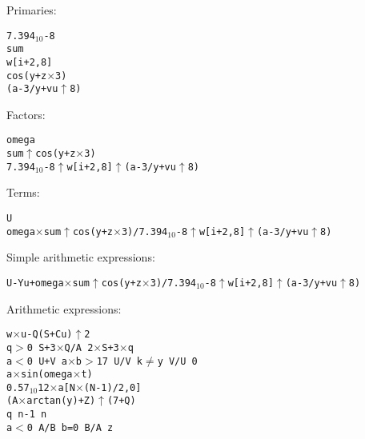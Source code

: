 \documentclass[a4paper,11pt]{article}
\begin{document}
Primaries:

\begin{flushleft}
\texttt{7.394$_{10}$-8\\
sum\\
w[i+2,8]\\
cos(y+z$\times$3)\\
(a-3/y+vu$\uparrow$8)\\
}\end{flushleft}

Factors:

\begin{flushleft}
\texttt{omega\\
sum$\uparrow$cos(y+z$\times$3)\\
7.394$_{10}$-8$\uparrow$w[i+2,8]$\uparrow$(a-3/y+vu$\uparrow$8)
}\end{flushleft}

Terms:

\begin{flushleft}
\texttt{U\\
omega$\times$sum$\uparrow$cos(y+z$\times${}3)/7.394$_{10}$-8$\uparrow$w[i+2,8]$\uparrow$(a-3/y+vu$\uparrow$8)\\
}\end{flushleft}

Simple arithmetic expressions:

\begin{flushleft}
\texttt{U-Yu+omega$\times$sum$\uparrow$cos(y+z$\times$3)/7.394$_{10}$-8$\uparrow$w[i+2,8]$\uparrow$(a-3/y+vu$\uparrow$8)\\
}\end{flushleft}

Arithmetic expressions:

\begin{flushleft}
\texttt{w$\times$u-Q(S+Cu)$\uparrow$2\\
 q$>$0  S+3$\times$Q/A  2$\times$S+3$\times$q\\
 a$<$0  U+V   a$\times$b$>$17  U/V   k$\neq$y 
    V/U  0\\
a$\times$sin(omega$\times$t)\\
0.57$_{10}$12$\times$a[N$\times$(N-1)/2,0]\\
(A$\times$arctan(y)+Z)$\uparrow$(7+Q)\\
 q  n-1  n\\
 a$<$0  A/B   b=0  B/A  z\\
}\end{flushleft}
\end{document}
